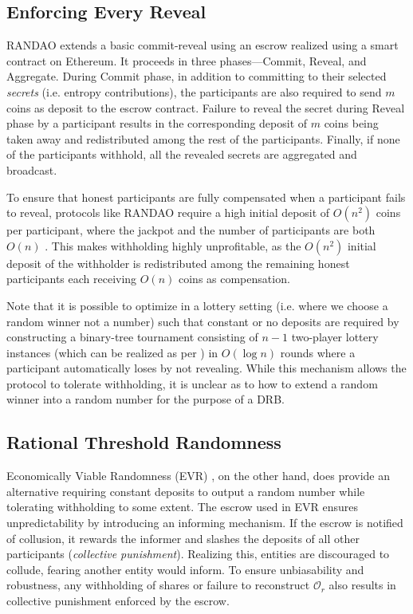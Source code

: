 \documentclass[letterpaper,twocolumn,10pt]{article}
\theoremstyle{definition}
\theoremstyle{remark}
\begin{document}
\subsection{Enforcing Every Reveal}
RANDAO \cite{youcai2017randao} extends a basic commit-reveal using an escrow realized using a smart contract on Ethereum. It proceeds in three phases---Commit, Reveal, and Aggregate. During Commit phase, in addition to committing to their selected \textit{secrets} (i.e. entropy contributions), the participants are also required to send $m$ coins as deposit to the escrow contract. Failure to reveal the secret during Reveal phase by a participant results in the corresponding deposit of $m$ coins being taken away and redistributed among the rest of the participants. Finally, if none of the participants withhold, all the revealed secrets are aggregated and broadcast.

To ensure that honest participants are fully compensated when a participant fails to reveal, protocols like RANDAO require a high initial deposit of $O(n^2)$ coins per participant, where the jackpot and the number of participants are both $O(n)$ \cite{andrychowicz2014secure, bentov2014use}. This makes withholding highly unprofitable, as the $O(n^2)$ initial deposit of the withholder is redistributed among the remaining honest participants each receiving $O(n)$ coins as compensation.

Note that it is possible to optimize in a lottery setting (i.e. where we choose a random winner not a number) such that constant or no deposits are required \cite{bartoletti2017constant, miller2017zero} by constructing a binary-tree tournament consisting of $n - 1$ two-player lottery instances (which can be realized as per \cite{andrychowicz2014fair, andrychowicz2014secure}) in $O(\log n)$ rounds where a participant automatically loses by not revealing. While this mechanism allows the protocol to tolerate withholding, it is unclear as to how to extend a random winner into a random number for the purpose of a DRB.

\subsection{Rational Threshold Randomness}
Economically Viable Randomness (EVR) \cite{david2020economically}, on the other hand, does provide an alternative requiring constant deposits to output a random number while tolerating withholding to some extent. The escrow used in EVR ensures unpredictability by introducing an informing mechanism. If the escrow is notified of collusion, it rewards the informer and slashes the deposits of all other participants (\textit{collective punishment}). Realizing this, entities are discouraged to collude, fearing another entity would inform. To ensure unbiasability and robustness, any withholding of shares or failure to reconstruct $\mathcal{O}_r$ also results in collective punishment enforced by the escrow.
\end{document}
